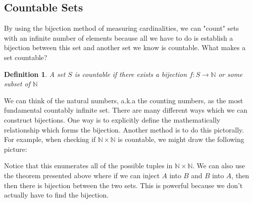 \documentclass{article}
\newtheorem{definition}{Definition}
\begin{document}
\subsection{Countable Sets}
By using the bijection method of measuring cardinalities, we can "count" sets with an infinite number of elements because all we have to do is
establish a bijection between this set and another set we know is countable. What makes a set countable?
\begin{definition}
    A set $S$ is countable if there exists a bijection $f:S\rightarrow\mathbb{N}$ or some subset of $\mathbb{N}$
\end{definition}
We can think of the natural numbers, a.k.a the counting numbers, as the most fundamental countably infinite set. There are many different
ways which we can construct bijections. One way is to explicitly define the mathematically relationship
which forms the bijection. Another method is to do this pictorally. For example, when checking if $\mathbb{N}\times\mathbb{N}$
is countable, we might draw the following picture:
\begin{figure}[h]
    \centering
\end{figure}
Notice that this enumerates all of the possible tuples in $\mathbb{N}\times\mathbb{N}$.
We can also use the theorem presented above where if we can inject $A$ into $B$ and $B$ into $A$, then
then there is bijection between the two sets. This is powerful because we don't actually have to find the bijection.
\end{document}
